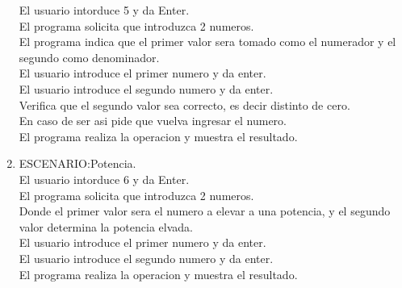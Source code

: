 \documentclass[a4paper,12pt]{article}
\begin{document}
\begin{enumerate}
    El usuario intorduce 5 y da Enter.\\
    El programa solicita que introduzca 2 numeros.\\
    El programa indica que el primer valor sera tomado como el numerador y el segundo como denominador.\\
    El usuario introduce el primer numero y da enter.\\
    El usuario introduce el segundo numero y da enter.\\
    Verifica que el segundo valor sea correcto, es decir distinto de cero.\\
    En caso de ser asi pide que vuelva ingresar el numero.\\
    El programa realiza la operacion y muestra el resultado.\\
    \item ESCENARIO:Potencia.\\
    El usuario intorduce 6 y da Enter.\\
    El programa solicita que introduzca 2 numeros.\\
    Donde el primer valor sera el numero a elevar a una potencia, y el segundo valor determina la potencia elvada.\\
    El usuario introduce el primer numero y da enter.\\
    El usuario introduce el segundo numero y da enter.\\
    El programa realiza la operacion y muestra el resultado.\\
\end{enumerate}
\end{document}
